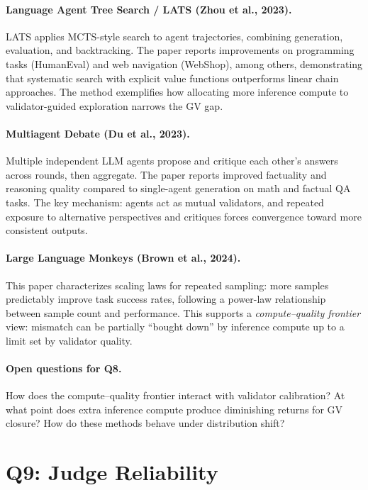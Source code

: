 \documentclass[11pt]{article}
\begin{document}
\paragraph{Language Agent Tree Search / LATS (Zhou et al., 2023).}
LATS applies MCTS-style search to agent trajectories, combining generation, evaluation, and backtracking. The paper reports improvements on programming tasks (HumanEval) and web navigation (WebShop), among others, demonstrating that systematic search with explicit value functions outperforms linear chain approaches. The method exemplifies how allocating more inference compute to validator-guided exploration narrows the GV gap.

\paragraph{Multiagent Debate (Du et al., 2023).}
Multiple independent LLM agents propose and critique each other's answers across rounds, then aggregate. The paper reports improved factuality and reasoning quality compared to single-agent generation on math and factual QA tasks. The key mechanism: agents act as mutual validators, and repeated exposure to alternative perspectives and critiques forces convergence toward more consistent outputs.

\paragraph{Large Language Monkeys (Brown et al., 2024).}
This paper characterizes scaling laws for repeated sampling: more samples predictably improve task success rates, following a power-law relationship between sample count and performance. This supports a \emph{compute--quality frontier} view: mismatch can be partially ``bought down'' by inference compute up to a limit set by validator quality.

\paragraph{Open questions for Q8.}
How does the compute--quality frontier interact with validator calibration? At what point does extra inference compute produce diminishing returns for GV closure? How do these methods behave under distribution shift?

\section{Q9: Judge Reliability}
\end{document}
